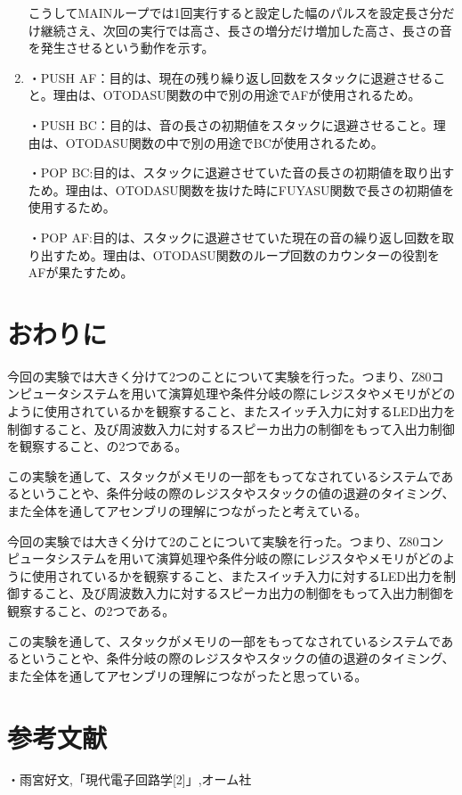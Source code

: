 \documentclass[11pt,a4j]{jsarticle}
\begin{document}
\begin{enumerate}
   こうしてMAINループでは1回実行すると設定した幅のパルスを設定長さ分だけ継続さえ、次回の実行では高さ、長さの増分だけ増加した高さ、長さの音を発生させるという動作を示す。
   \item 

・PUSH AF：目的は、現在の残り繰り返し回数をスタックに退避させること。理由は、OTODASU関数の中で別の用途でAFが使用されるため。

・PUSH BC：目的は、音の長さの初期値をスタックに退避させること。理由は、OTODASU関数の中で別の用途でBCが使用されるため。

・POP BC:目的は、スタックに退避させていた音の長さの初期値を取り出すため。理由は、OTODASU関数を抜けた時にFUYASU関数で長さの初期値を使用するため。

・POP AF:目的は、スタックに退避させていた現在の音の繰り返し回数を取り出すため。理由は、OTODASU関数のループ回数のカウンターの役割をAFが果たすため。
   \end{enumerate}
   
  
  
 \section{おわりに}
  
  今回の実験では大きく分けて2つのことについて実験を行った。つまり、Z80コンピュータシステムを用いて演算処理や条件分岐の際にレジスタやメモリがどのように使用されているかを観察すること、またスイッチ入力に対するLED出力を制御すること、及び周波数入力に対するスピーカ出力の制御をもって入出力制御を観察すること、の2つである。
  
  この実験を通して、スタックがメモリの一部をもってなされているシステムであるということや、条件分岐の際のレジスタやスタックの値の退避のタイミング、また全体を通してアセンブリの理解につながったと考えている。
  
  今回の実験では大きく分けて2のことについて実験を行った。つまり、Z80コンピュータシステムを用いて演算処理や条件分岐の際にレジスタやメモリがどのように使用されているかを観察すること、またスイッチ入力に対するLED出力を制御すること、及び周波数入力に対するスピーカ出力の制御をもって入出力制御を観察すること、の2つである。
  
  この実験を通して、スタックがメモリの一部をもってなされているシステムであるということや、条件分岐の際のレジスタやスタックの値の退避のタイミング、また全体を通してアセンブリの理解につながったと思っている。 
  
 \section{参考文献}
  ・雨宮好文,「現代電子回路学[2]」,オーム社
  
  
\end{document}
